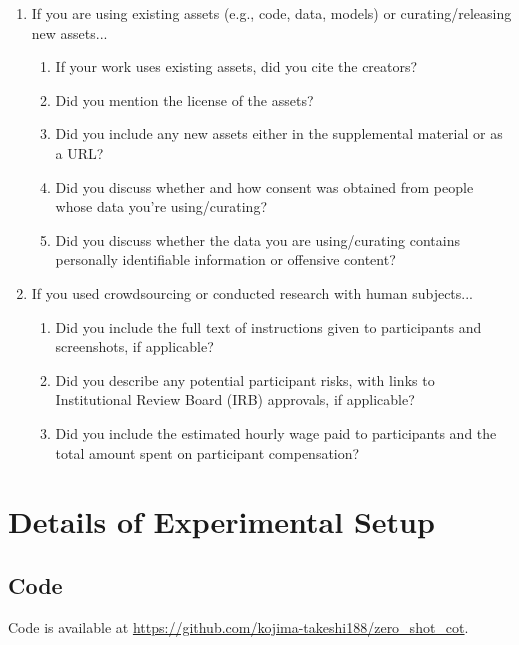 \documentclass{article}
\begin{document}
\begin{enumerate}
\item If you are using existing assets (e.g., code, data, models) or curating/releasing new assets...
\begin{enumerate}
  \item If your work uses existing assets, did you cite the creators?
    \answerYes{}
  \item Did you mention the license of the assets?
    \answerYes{}
  \item Did you include any new assets either in the supplemental material or as a URL?
    \answerYes{}
  \item Did you discuss whether and how consent was obtained from people whose data you're using/curating?
    \answerYes{}
  \item Did you discuss whether the data you are using/curating contains personally identifiable information or offensive content?
    \answerYes{}
\end{enumerate}


\item If you used crowdsourcing or conducted research with human subjects...
\begin{enumerate}
  \item Did you include the full text of instructions given to participants and screenshots, if applicable?
    \answerNA{}
  \item Did you describe any potential participant risks, with links to Institutional Review Board (IRB) approvals, if applicable?
    \answerNA{}
  \item Did you include the estimated hourly wage paid to participants and the total amount spent on participant compensation?
    \answerNA{}
\end{enumerate}


\end{enumerate}




\clearpage
\appendix

\section{Details of Experimental Setup}
\label{appx:experiment_setup}

\subsection{Code}

Code is available at
\url{https://github.com/kojima-takeshi188/zero_shot_cot}.
\end{document}
